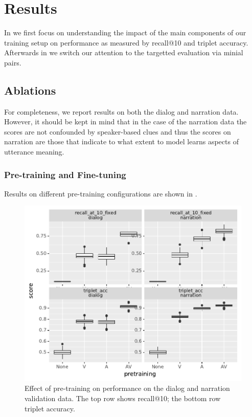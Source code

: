 \section{Results}
\label{sec:results}
In  we first focus on understanding the impact of
the main components of our training setup on performance as measured
by recall@10 and triplet accuracy. Afterwards in
 we switch our attention to the targetted
evaluation via minial pairs.


\subsection{Ablations}
\label{sec:ablations}
For completeness, we report results on both the dialog and narration
data. However, it should be kept in mind that in the case of the
narration data the scores are not confounded by speaker-based clues
and thus the scores on narration are those that indicate to what extent to
model learns aspects of utterance meaning.

\subsubsection{Pre-training and Fine-tuning}
Results on different pre-training configurations are shown in
.
\begin{figure}[htb]
	\centering
	\includegraphics[width=\columnwidth]{results/ablations/pretraining.pdf}
	\caption{Effect of pre-training on performance on the dialog
          and narration validation data. The top row shows recall@10;
          the bottom row triplet accuracy.}
	\label{fig:pretraining}
      \end{figure}

